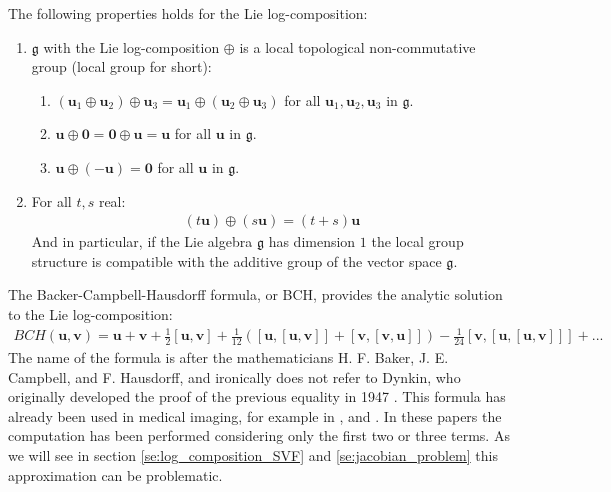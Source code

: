 \noindent
The following properties holds for the Lie log-composition:
\begin{enumerate}
	\item $\mathfrak{g} $ with the Lie log-composition $\oplus$ is a local topological non-commutative group (local group for short):
	\begin{enumerate}
		\item $(\mathbf{u}_{1}\oplus\mathbf{u}_{2}) \oplus \mathbf{u}_{3}
		= \mathbf{u}_{1}\oplus(\mathbf{u}_{2} \oplus \mathbf{u}_{3})$ for all $\mathbf{u}_{1}, \mathbf{u}_{2}, \mathbf{u}_{3}$ in $\mathfrak{g}$.
		\item $\mathbf{u}\oplus\mathbf{0}  = \mathbf{0}\oplus\mathbf{u} = \mathbf{u}$ for all $\mathbf{u}$ in $\mathfrak{g}$.
		\item $\mathbf{u}\oplus(-\mathbf{u} ) = \mathbf{0}$ for all $\mathbf{u}$ in $\mathfrak{g}$.
	\end{enumerate}
	\item For all $t,s$ real:
	\begin{align*}
	(t\mathbf{u})\oplus (s\mathbf{u}) = (t+s)\mathbf{u}
	\end{align*}
	And in particular, if the Lie algebra $\mathfrak{g}$ has dimension $1$ the local group structure is compatible with the additive group of the vector space $\mathfrak{g}$.
\end{enumerate}


The Backer-Campbell-Hausdorff formula, or BCH,
provides the analytic solution to the Lie log-composition: 
\begin{align*}
BCH(\mathbf{u},\mathbf{v}) 
= 
\mathbf{u} + \mathbf{v} + \frac{1}{2}[\mathbf{u},\mathbf{v}] + \frac{1}{12}([\mathbf{u},[\mathbf{u},\mathbf{v}]]
+ [\mathbf{v},[\mathbf{v},\mathbf{u}]]) - \frac{1}{24}[\mathbf{v},[\mathbf{u},[\mathbf{u},\mathbf{v}]]] +... 
\end{align*}
The name of the formula is after the mathematicians H. F. Baker, J. E. Campbell, and F. Hausdorff, and ironically does not refer to Dynkin, who originally developed the proof of the previous equality in 1947 \cite{dynkin1947calculation}. 
This formula has already been used in medical imaging, for example in \cite{lorenzi2014efficient}, \cite{vercauteren08} and \cite{bossa2008new}. In these papers the computation has been performed considering only the first two or three terms. As we will see in section \ref{se:log_composition_SVF} and \ref{se:jacobian_problem} this approximation can be problematic.

